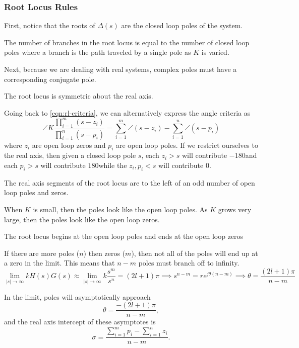 \subsubsection{Root Locus Rules}
First, notice that the roots of $\Delta(s)$ are the closed loop poles of the system. 
\begin{theorem}
  The number of branches in the root locus is equal to the number of closed loop poles where a branch is the path traveled by a single pole as $K$ is varied.
  \label{thm:rl-one}
\end{theorem}
Next, because we are dealing with real systems, complex poles must have a corresponding conjugate pole.
\begin{theorem}
  The root locus is symmetric about the real axis.
  \label{thm:rl-two}
\end{theorem}
Going back to \cref{eqn:rl-criteria}, we can alternatively express the angle criteria as
\[
  \angle K \frac{\prod_{i=1}^m (s-z_i)}{\prod_{i=1}^n (s-p_i)} = \sum_{i=1}^m \angle (s-z_i) - \sum_{i=1}^n \angle (s-p_i)
\]
where $z_i$ are open loop zeros and $p_i$ are open loop poles.
If we restrict ourselves to the real axis, then given a closed loop pole $s$, each $z_i > s$ will contribute $-180$\textdegree and each $p_i > s$ will contribute $180$\textdegree while the $z_i, p_i < s$ will contribute $0$\textdegree.
\begin{theorem}
  The real axis segments of the root locus are to the left of an odd number of open loop poles and zeros.
  \label{thm:rl-three}
\end{theorem}
When $K$ is small, then the poles look like the open loop poles. As $K$ grows very large, then the poles look like the open loop zeros.
\begin{theorem}
  The root locus begins at the open loop poles and ends at the open loop zeros
  \label{eqn:rl-four}
\end{theorem}
If there are more poles ($n$) then zeros ($m$), then not all of the poles will end up at a zero in the limit. This means that $n-m$ poles must branch off to infinity.
\[
  \lim_{|s|\to\infty} kH(s)G(s) \approx \lim_{|s|\to\infty}k\frac{s^m}{s^n} = (2l+1)\pi \implies s^{n-m} = re^{j\theta(n-m)} \implies \theta = \frac{(2l+1)\pi}{n-m}
\]
\begin{theorem}
  In the limit, poles will asymptotically approach
  \[
	\theta = \frac{-(2l+1)\pi}{n-m},
  \]
  and the real axis intercept of these asymptotes is
  \[
	\sigma = \frac{\sum_{i=1}^m p_i - \sum_{i=1}^n z_i}{n-m}.
  \]
  \label{eqn:rl-five}
\end{theorem}

